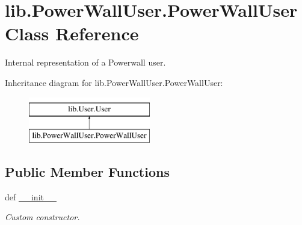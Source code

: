 \hypertarget{classlib_1_1PowerWallUser_1_1PowerWallUser}{\section{lib.\-Power\-Wall\-User.\-Power\-Wall\-User \-Class \-Reference}
\label{classlib_1_1PowerWallUser_1_1PowerWallUser}
}


\-Internal representation of a \-Powerwall user.  


\-Inheritance diagram for lib.\-Power\-Wall\-User.\-Power\-Wall\-User\-:\begin{figure}[H]
\begin{center}
\leavevmode
\includegraphics[height=2.000000cm]{classlib_1_1PowerWallUser_1_1PowerWallUser}
\end{center}
\end{figure}
\subsection*{\-Public \-Member \-Functions}
\begin{DoxyCompactItemize}
\item 
def \hyperlink{classlib_1_1PowerWallUser_1_1PowerWallUser_aec29e4f909ca5c75619b4fe6a1ff61ef}{\-\_\-\-\_\-init\-\_\-\-\_\-}
\begin{DoxyCompactList}\small\item\em \-Custom constructor. \end{DoxyCompactList}\end{DoxyCompactItemize}
